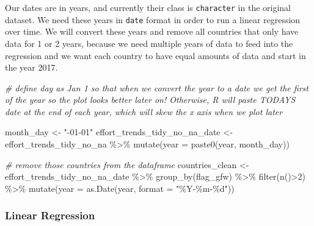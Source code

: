 \documentclass[
]{article}
\newenvironment{Shaded}{\begin{snugshade}}{\end{snugshade}}
\newcommand{\AttributeTok}[1]{\textcolor[rgb]{0.77,0.63,0.00}{#1}}
\newcommand{\CommentTok}[1]{\textcolor[rgb]{0.56,0.35,0.01}{\textit{#1}}}
\newcommand{\DecValTok}[1]{\textcolor[rgb]{0.00,0.00,0.81}{#1}}
\newcommand{\FunctionTok}[1]{\textcolor[rgb]{0.00,0.00,0.00}{#1}}
\newcommand{\NormalTok}[1]{#1}
\newcommand{\OtherTok}[1]{\textcolor[rgb]{0.56,0.35,0.01}{#1}}
\newcommand{\SpecialCharTok}[1]{\textcolor[rgb]{0.00,0.00,0.00}{#1}}
\newcommand{\StringTok}[1]{\textcolor[rgb]{0.31,0.60,0.02}{#1}}
\begin{document}
Our dates are in years, and currently their class is \texttt{character}
in the original dataset. We need these years in \texttt{date} format in
order to run a linear regression over time. We will convert these years
and remove all countries that only have data for 1 or 2 years, because
we need multiple years of data to feed into the regression and we want
each country to have equal amounts of data and start in the year 2017.

\begin{Shaded}
\begin{Highlighting}[]
\CommentTok{\# define day as Jan 1 so that when we convert the year to a date we get the first of the year so the plot looks better later on! Otherwise, R will paste TODAY\textquotesingle{}S date at the end of each year, which will skew the x axis when we plot later}

\NormalTok{month\_day }\OtherTok{\textless{}{-}} \StringTok{"{-}01{-}01"}
\NormalTok{effort\_trends\_tidy\_no\_na\_date }\OtherTok{\textless{}{-}}\NormalTok{ effort\_trends\_tidy\_no\_na }\SpecialCharTok{\%\textgreater{}\%} 
  \FunctionTok{mutate}\NormalTok{(}\AttributeTok{year =} \FunctionTok{paste0}\NormalTok{(year, month\_day))}

\CommentTok{\# remove those countries from the dataframe}
\NormalTok{countries\_clean }\OtherTok{\textless{}{-}}\NormalTok{ effort\_trends\_tidy\_no\_na\_date }\SpecialCharTok{\%\textgreater{}\%} 
  \FunctionTok{group\_by}\NormalTok{(flag\_gfw) }\SpecialCharTok{\%\textgreater{}\%}
  \FunctionTok{filter}\NormalTok{(}\FunctionTok{n}\NormalTok{()}\SpecialCharTok{\textgreater{}}\DecValTok{2}\NormalTok{) }\SpecialCharTok{\%\textgreater{}\%} 
  \FunctionTok{mutate}\NormalTok{(}\AttributeTok{year =} \FunctionTok{as.Date}\NormalTok{(year, }\AttributeTok{format =} \StringTok{"\%Y{-}\%m{-}\%d"}\NormalTok{))}
\end{Highlighting}
\end{Shaded}

\hypertarget{linear-regression}{%
\subsubsection{Linear Regression}\label{linear-regression}}
\end{document}
